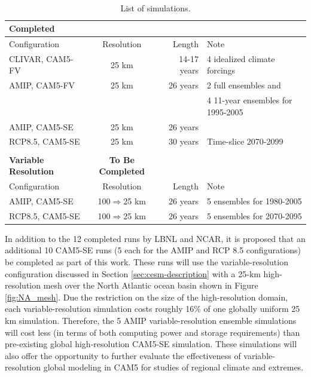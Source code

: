 \documentclass[11pt]{article}
\begin{document}
\begin{table} 
\begin{center}
\caption{List of simulations.\label{t:runs} }
\ \\
\begin{tabular}{l c r l}
\textbf{Completed} \\
\hline
Configuration & Resolution & Length & Note \\ 
\hline
CLIVAR, CAM5-FV & 25 km & 14-17 years & 4 idealized climate forcings  \\
AMIP, CAM5-FV & 25 km & 26 years    & 2 full ensembles and  \\
& & & 4 11-year ensembles for 1995-2005 \\
AMIP, CAM5-SE & 25 km & 26 years    & \\
RCP8.5, CAM5-SE & 25 km & 30 years    & Time-slice 2070-2099 \\
\hline
\\
\textbf{Variable Resolution} & \textbf{To Be Completed} & & \\
\hline
Configuration & Resolution & Length & Note \\ 
\hline
AMIP, CAM5-SE & 100$\Rightarrow$25 km & 26 years    & 5 ensembles for 1980-2005 \\
RCP8.5, CAM5-SE & 100$\Rightarrow$25 km & 26 years    & 5 ensembles for 2070-2095 \\
\hline
\end{tabular}
\end{center}
\end{table}

In addition to the 12 completed runs by LBNL and NCAR, it is proposed that an additional 10 CAM5-SE runs (5 each for the AMIP and RCP 8.5 configurations) be completed as part of this work.  These runs will use the variable-resolution configuration discussed in Section \ref{sec:cesm-description} with a 25-km high-resolution mesh over the North Atlantic ocean basin shown in Figure \ref{fig:NA_mesh}. Due the restriction on the size of the high-resolution domain, each variable-resolution simulation costs roughly 16\% of one globally uniform 25 km simulation.  Therefore, the 5 AMIP variable-resolution ensemble simulations will cost less (in terms of both computing power and storage requirements) than pre-existing global high-resolution CAM5-SE simulation. These simulations will also offer the opportunity to further evaluate the effectiveness of variable-resolution global modeling in CAM5 for studies of regional climate and extremes. 
\end{document}
